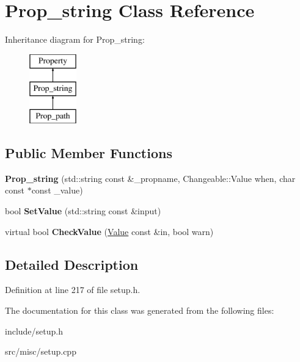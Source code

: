 \hypertarget{classProp__string}{\section{Prop\-\_\-string Class Reference}
\label{classProp__string}
}
Inheritance diagram for Prop\-\_\-string\-:\begin{figure}[H]
\begin{center}
\leavevmode
\includegraphics[height=3.000000cm]{classProp__string}
\end{center}
\end{figure}
\subsection*{Public Member Functions}
\begin{DoxyCompactItemize}
\item 
\hypertarget{classProp__string_ad7cfeff160dad431615b378934fd409f}{{\bfseries Prop\-\_\-string} (std\-::string const \&\-\_\-propname, Changeable\-::\-Value when, char const $\ast$const \-\_\-value)}\label{classProp__string_ad7cfeff160dad431615b378934fd409f}

\item 
\hypertarget{classProp__string_a5282cc0546eed955bcd8846aff969cd0}{bool {\bfseries Set\-Value} (std\-::string const \&input)}\label{classProp__string_a5282cc0546eed955bcd8846aff969cd0}

\item 
\hypertarget{classProp__string_ad1fceed071e39d195d2369e1c836ff9a}{virtual bool {\bfseries Check\-Value} (\hyperlink{classValue}{Value} const \&in, bool warn)}\label{classProp__string_ad1fceed071e39d195d2369e1c836ff9a}

\end{DoxyCompactItemize}


\subsection{Detailed Description}


Definition at line 217 of file setup.\-h.



The documentation for this class was generated from the following files\-:\begin{DoxyCompactItemize}
\item 
include/setup.\-h\item 
src/misc/setup.\-cpp\end{DoxyCompactItemize}

